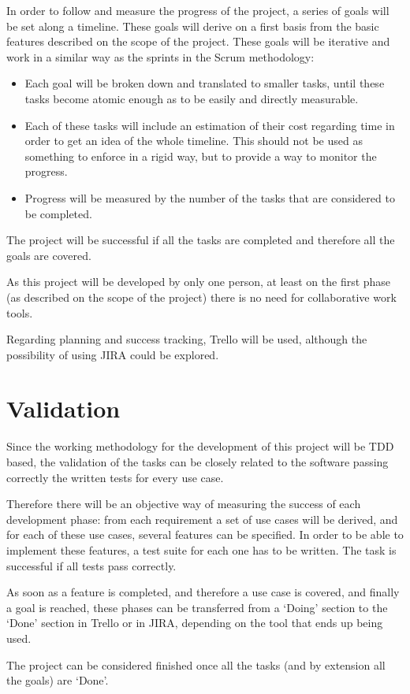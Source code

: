 In order to follow and measure the progress of the project, a series of goals will be set along a timeline. These goals will derive on a first basis from the basic features described on the scope of the project. These goals will be iterative and work in a similar way as the sprints in the Scrum methodology:

\begin{itemize}
\item Each goal will be broken down and translated to smaller tasks, until these tasks become atomic enough as to be easily and directly measurable.

\item Each of these tasks will include an estimation of their cost regarding time in order to get an idea of the whole timeline. This should not be used as something to enforce in a rigid way, but to provide a way to monitor the progress. 

\item Progress will be measured by the number of the tasks that are considered to be completed. 
\end{itemize}

The project will be successful if all the tasks are completed and therefore all the goals are covered.

As this project will be developed by only one person, at least on the first phase (as described on the scope of the project) there is no need for collaborative work tools.

Regarding planning and success tracking, Trello will be used, although the possibility of using JIRA could be explored.

\section{Validation}
Since the working methodology for the development of this project will be TDD based, the validation of the tasks can be closely related to the software passing correctly the written tests for every use case. 

Therefore there will be an objective way of measuring the success of each development phase: from each requirement a set of use cases will be derived, and for each of these use cases, several features can be specified. In order to be able to implement these features, a test suite for each one has to be written. The task is successful if all tests pass correctly.

As soon as a feature is completed, and therefore a use case is covered, and finally a goal is reached, these phases can be transferred from a ‘Doing’ section to the ‘Done’ section in Trello or in JIRA, depending on the tool that ends up being used.

The project can be considered finished once all the tasks (and by extension all the goals) are ‘Done’.